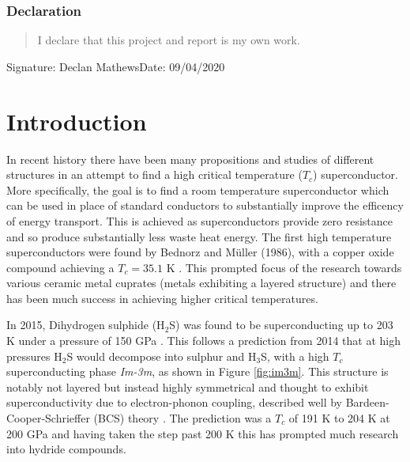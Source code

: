 \documentclass[a4paper,12pt]{article}
\begin{document}
\vspace*{0.5cm}

\subsubsection*{Declaration}

\begin{quotation}
\noindent I declare that this project and report is my own work.
\end{quotation}

\vspace*{1.5cm}
Signature: Declan Mathews\hspace*{7cm}Date: 09/04/2020

\newpage
%
\tableofcontents                                %
\pagestyle{plain}                               %
\setcounter{page}{1}                            %

\section{Introduction}
In recent history there have been many propositions and studies of different structures in an attempt to find a high critical temperature ($T_c$) superconductor. More specifically, the goal is to find a room temperature superconductor which can be used in place of standard conductors to substantially improve the efficency of energy transport. This is achieved as superconductors provide zero resistance and so produce substantially less waste heat energy. The first high temperature superconductors were found by Bednorz and M\"{u}ller (1986), with a copper oxide compound achieving a $T_c=35.1$ K \cite{bednorz_muller}. This prompted focus of the research towards various ceramic metal cuprates (metals exhibiting a layered structure) and there has been much success in achieving higher critical temperatures.

\bigskip

\noindent In 2015, Dihydrogen sulphide (H$_2$S) was found to be superconducting up to 203 K under a pressure of 150 GPa \cite{Drozdov_2015}. This follows a prediction from 2014 that at high pressures H$_2$S would decompose into sulphur and H$_3$S, with a high $T_c$ superconducting phase \textit{Im-3m}, as shown in Figure \ref{fig:im3m}. This structure is notably not layered but instead highly symmetrical and thought to exhibit superconductivity due to electron-phonon coupling, described well by Bardeen-Cooper-Schrieffer (BCS) theory \cite{BCS}. The prediction was a $T_c$ of 191 K to 204 K at 200 GPa \cite{duan} and having taken the step past 200 K this has prompted much research into hydride compounds.
\end{document}
